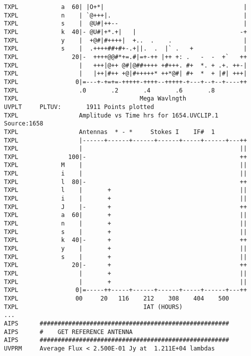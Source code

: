 \begin{verbatim}
TXPL            a  60| |O+*|                                       |
TXPL            n    | `@+++|.                                     |
TXPL            s    |  @U#|++--                                   |
TXPL            k  40|- @U#|+*.+|   |                             -+
TXPL            y    |  +@#|#++++|  +..  .    .                    |
TXPL            s    |  .++++##+#+-.+||.  .  |` .   +              |
TXPL               20|-  ++++@@#*+=.#|=+-++ |++ +: .   -  -  +`   ++
TXPL                 |   +++|@++ @#|@##++++ +#+++. #+  *. + .+. ++-|
TXPL                 |   |++|#++ +@|#+++++* ++*@#| #+  *  + |#| +++|
TXPL                0|=---+-+=+=-+++++-++++--+++++-+---+--+--+----++
TXPL                 .0       .2       .4       .6       .8
TXPL                                  Mega Wavlngth
UVPLT     PLTUV:       1911 Points plotted
TXPL                 Amplitude vs Time hrs for 1654.UVCLIP.1   Source:1658
TXPL                 Antennas  * - *     Stokes I    IF#  1
TXPL                 |------+------+------+------+-----+------+---++
TXPL                 |                                            ||
TXPL              100|-                                           ++
TXPL            M    |                                            ||
TXPL            i    |                                            ||
TXPL            l  80|-                                           ++
TXPL            l    |       +                                    ||
TXPL            i    |       +                                    ||
TXPL            J    |-      +                                    ++
TXPL            a  60|       +                                    ||
TXPL            n    |       +                                    ||
TXPL            s    |       +                                    ||
TXPL            k  40|-      +                                    ++
TXPL            y    |       +                                    ||
TXPL            s    |       +                                    ||
TXPL               20|-      +                                    ++
TXPL                 |       +                                    ||
TXPL                 |       +                                    ||
TXPL                0|=-----++-----+------+------+-----+------+---++
TXPL                00     20   116    212    308    404    500
TXPL                                   IAT (HOURS)
...
AIPS      #####################################################
AIPS      #    GET REFERENCE ANTENNA
AIPS      #####################################################
UVPRM     Average Flux < 2.500E-01 Jy at  1.211E+04 lambdas

\end{verbatim}
